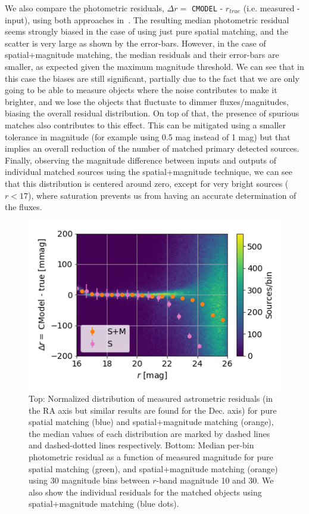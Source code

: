 \documentclass[\docopts]{\docclass}
\begin{document}
We also compare the photometric residuals, $\Delta r = $ \texttt{CMODEL} - $r_{true}$ (i.e. measured - input), using both approaches in~. The resulting median photometric residual seems strongly biased in the case of using just pure spatial matching, and the scatter is very large as shown by the error-bars. However, in the case of spatial+magnitude matching, the median residuals and their error-bars are smaller, as expected given the maximum magnitude threshold. We can see that in this case the biases are still significant, partially due to the fact that we are only going to be able to measure objects where the noise contributes to make it brighter, and we lose the objects that fluctuate to dimmer fluxes/magnitudes, biasing the overall residual distribution. On top of that, the presence of spurious matches also contributes to this effect. This can be mitigated using a smaller tolerance in magnitude (for example using 0.5 mag instead of 1 mag) but that implies an overall reduction of the number of matched primary detected sources. Finally, observing the magnitude difference between inputs and outputs of individual matched sources using the spatial+magnitude technique, we can see that this distribution is centered around zero, except for very bright sources ($r < 17$), where saturation prevents us from having an accurate determination of the fluxes. 

\begin{figure}
\centering
\includegraphics[width=0.85\columnwidth]{photometry_residual_comparison}
\caption{Top: Normalized distribution of measured astrometric residuals (in the RA axis but similar results are found for the Dec. axis) for pure spatial matching (blue) and spatial+magnitude matching (orange), the median values of each distribution are marked by dashed lines and dashed-dotted lines respectively. Bottom: Median per-bin photometric residual as a function of measured magnitude for pure spatial matching (green), and spatial+magnitude matching (orange) using 30 magnitude bins between $r$-band magnitude 10 and 30. We also show the individual residuals for the matched objects using spatial+magnitude matching (blue dots).}
\label{fig:matching_comparison}
\end{figure}
\end{document}
